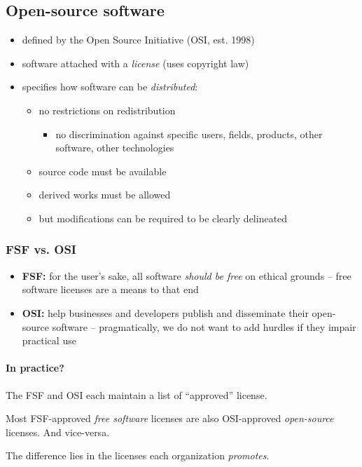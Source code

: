 \documentclass[12pt]{article}
\begin{document}
\subsection{Open-source software}
\begin{itemize}
    \item defined by the Open Source Initiative (OSI, est. 1998)
    \item software attached with a \textit{license} (uses copyright law)
    \item specifies how software can be \textit{distributed}:
    \begin{itemize}
        \item no restrictions on redistribution
        \begin{itemize}
            \item no discrimination against specific users, fields, products, other software, other technologies
        \end{itemize}
        \item source code must be available
        \item derived works must be allowed
        \item but modifications can be required to be clearly delineated
    \end{itemize}
\end{itemize}
\subsubsection{FSF vs. OSI}
\begin{itemize}
  \item \textbf{FSF:} for the user's sake, all software \textit{should be free} on ethical grounds -- free software licenses are a means to that end
  \item \textbf{OSI:} help businesses and developers publish and disseminate their open-source software -- pragmatically, we do not want to add hurdles if they impair practical use
\end{itemize}

\paragraph{In practice?}
The FSF and OSI each maintain a list of ``approved'' license.

Most FSF-approved \textit{free software} licenses are also OSI-approved \textit{open-source} licenses. And vice-versa.

The difference lies in the licenses each organization \textit{promotes}.
\end{document}
